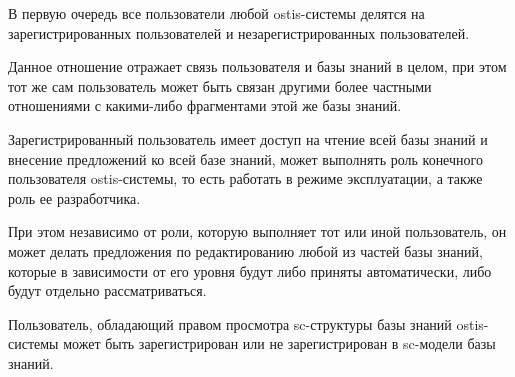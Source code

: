 В первую очередь все пользователи любой ostis-системы делятся на зарегистрированных пользователей и незарегистрированных пользователей.

\begin{SCn}

\begin{scnindent}
	\begin{scneqtoset}
	\end{scneqtoset}
\end{scnindent}
\end{SCn}

Данное отношение отражает связь пользователя и базы знаний в целом, при этом тот же сам пользователь может быть связан другими более частными отношениями с какими-либо фрагментами этой же базы знаний.

Зарегистрированный пользователь имеет доступ на чтение всей базы знаний и внесение предложений ко всей базе знаний, может выполнять роль конечного пользователя ostis-системы, то есть работать в режиме эксплуатации, а также роль ее разработчика. 

При этом независимо от роли, которую выполняет тот или иной пользователь, он может делать предложения по редактированию любой из частей базы знаний, которые в зависимости от его уровня будут либо приняты автоматически, либо будут отдельно рассматриваться.


\begin{SCn}
\end{SCn}

Пользователь, обладающий правом просмотра sc-структуры базы знаний ostis-системы может быть зарегистрирован или не зарегистрирован в sc-модели базы знаний.

